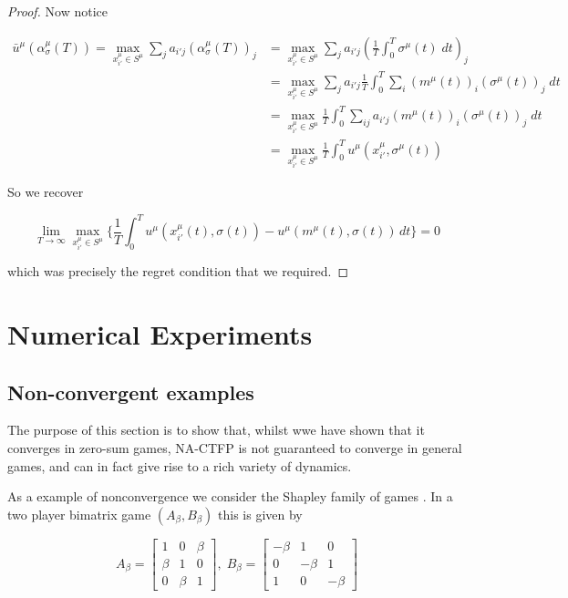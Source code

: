 \documentclass{article}
\theoremstyle{definition}
\begin{document}
\begin{proof}
    Now notice

    \begin{align*}
      \bar{u}^\mu (\alpha_\sigma^\mu (T)) = \max_{x^\mu_{i'} \in S^\mu} \sum_{j} a_{i'j} (\alpha_{\sigma}^\mu (T))_j & = \max_{x^\mu_{i'} \in S^\mu} \sum_{j} a_{i'j} (\frac{1}{T} \int_{0}^{T} \sigma^\mu(t) \; dt)_j \\
      & = \max_{x^\mu_{i'} \in S^\mu} \sum_{j} a_{i'j} \frac{1}{T} \int_{0}^{T} \sum_i (m^\mu (t))_i (\sigma^\mu(t))_j \; dt\\
      & = \max_{x^\mu_{i'} \in S^\mu} \frac{1}{T} \int_0^T \sum_{ij} a_{i'j} (m^\mu (t))_i (\sigma^\mu(t))_j \; dt\\
      & = \max_{x^\mu_{i'} \in S^\mu} \frac{1}{T} \int_0^T u^\mu(x^\mu_{i'}, \sigma^\mu(t))
    \end{align*}

    So we recover

    \begin{equation}
      \lim_{T \rightarrow \infty} \max_{x_{i'}^\mu \in S^\mu} \Big\{ \frac{1}{T} \int_{0}^{T} u^{\mu}(x_{i'}^\mu(t), \sigma(t)) - u^{\mu}(m^\mu(t), \sigma(t)) \, dt \Big\} = 0
    \end{equation}

    which was precisely the regret condition that we required.

  \end{proof}

\section{Numerical Experiments}

  \subsection{Non-convergent examples} \label{sec::NonConv}
  The purpose of this section is to show that, whilst wwe have shown that it converges in zero-sum games, NA-CTFP is not guaranteed to converge in general games, and can in fact give rise to a rich variety of dynamics.

  
  
  As a example of nonconvergence we consider the Shapley family of games \cite{}. In a two player bimatrix game $(A_\beta, B_\beta)$ this is given by

  \begin{equation}
    A_\beta = \begin{bmatrix}
      1 & 0 & \beta \\
      \beta & 1 & 0 \\
      0 & \beta & 1
    \end{bmatrix}, \; B_\beta =  \begin{bmatrix}
      - \beta & 1 & 0 \\
      0 & -\beta & 1 \\
      1 & 0 & -\beta
    \end{bmatrix}
  \end{equation}
\end{document}

